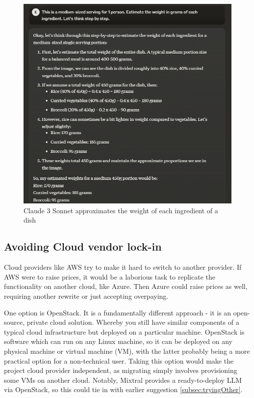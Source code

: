 \begin{figure}
    
    \centering
    \includegraphics[width=1\textwidth,keepaspectratio]{../images/sonnet_vision_2.png}
    \caption{Claude 3 Sonnet approximates the weight of each ingredient of a dish}
    \label{fig:sonnetV2}
    
\end{figure}

\subsection{Avoiding Cloud vendor lock-in}
Cloud providers like AWS try to make it hard to switch to another provider. If AWS were to raise prices, it would be a laborious task to replicate the functionality on another cloud, like Azure. Then Azure could raise prices as well, requiring another rewrite or just accepting overpaying.

One option is OpenStack. It is a fundamentally different approach - it is an open-source, private cloud solution. Whereby you still have similar components of a typical cloud infrastructure but deployed on a particular machine. OpenStack is software which can run on any Linux machine, so it can be deployed on any physical machine or virtual machine (VM), with the latter probably being a more practical option for a non-technical user. Taking this option would make the project cloud provider independent, as migrating simply involves provisioning some VMs on another cloud. Notably, Mixtral provides a ready-to-deploy LLM via OpenStack, so this could tie in with earlier suggestion \ref{subsec:tryingOther}.
